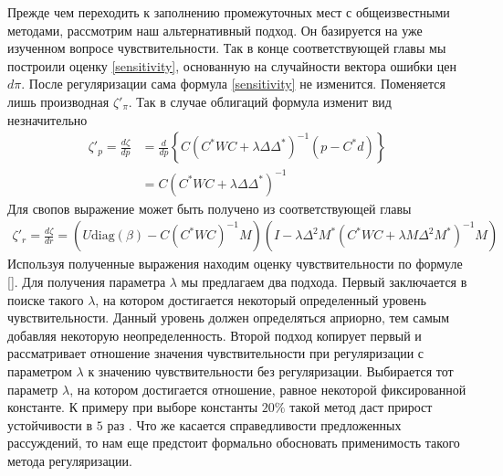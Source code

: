 \documentclass[10pt]{article}
\theoremstyle{definition}
\theoremstyle{remark}
\theoremstyle{plain}
\newcommand{\diag}{\mathrm{diag}}
\begin{document}
Прежде чем переходить к заполнению промежуточных мест с общеизвестными методами, рассмотрим наш альтернативный подход. Он базируется на уже изученном вопросе чувствительности. Так в конце соответствующей главы мы построили оценку \eqref{sensitivity}, основанную на случайности вектора ошибки цен $d\pi$. После регуляризации сама формула \eqref{sensitivity} не изменится. Поменяется лишь производная $\zeta'_\pi$. Так в случае облигаций формула изменит вид незначительно
\begin{align*}
\zeta'_p = \frac{d\zeta}{dp} &= \frac{d}{dp}\left\{C\left(C^*WC + \lambda\Delta\Delta^*\right)^{-1}(p-C^*d)\right\} \\
&= C\left(C^*WC + \lambda\Delta\Delta^*\right)^{-1}
\end{align*}
Для свопов выражение может быть получено из соответствующей главы
\begin{align*}
\zeta'_r = \frac{d\zeta}{dr} = (U\diag(\beta) - C(C^*WC)^{-1}M) \left( I-\lambda\Delta^2 M^*(C^*WC+\lambda M\Delta^2M^*)^{-1}M\right)
\end{align*}
Используя полученные выражения находим оценку чувствительности по формуле \eqref{}.
Для получения параметра $\lambda$ мы предлагаем два подхода. Первый заключается в поиске такого $\lambda$, на котором достигается некоторый определенный уровень чувствительности. Данный уровень должен определяться априорно, тем самым добавляя некоторую неопределенность.  Второй подход копирует первый и рассматривает отношение значения чувствительности при регуляризации с параметром $\lambda$ к значению чувствительности без регуляризации. Выбирается тот параметр $\lambda$, на котором достигается отношение, равное некоторой фиксированной константе. К примеру при выборе константы $20\%$ такой метод даст прирост устойчивости в $5$ раз
. Что же касается справедливости предложенных рассуждений, то нам еще предстоит формально обосновать применимость такого метода регуляризации.
\end{document}
